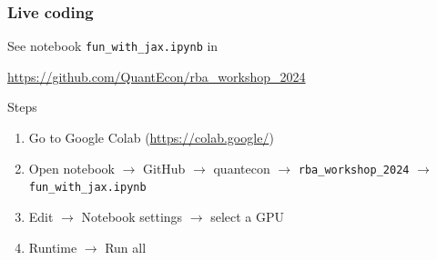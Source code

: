 \documentclass[
    xcolor={svgnames,dvipsnames},
    hyperref={colorlinks, citecolor=DeepPink4, linkcolor=DarkRed, urlcolor=DarkBlue}
    ]{beamer}  %
\newcommand{\1}{\mathbbm 1}
\begin{document}
\begin{frame}
    \frametitle{Live coding}

    See notebook \texttt{fun\_with\_jax.ipynb} in
    
    \begin{center}
        \url{https://github.com/QuantEcon/rba_workshop_2024}
    \end{center}

    \vspace{0.5em}
    Steps
    \begin{enumerate}
    \item Go to Google Colab (\url{https://colab.google/})
    \vspace{0.5em}
    \item Open notebook $\to$ GitHub $\to$ quantecon $\to$ \texttt{rba\_workshop\_2024}
        $\to$ \texttt{fun\_with\_jax.ipynb}
    \vspace{0.5em}
    \item Edit $\to$ Notebook settings $\to$ select a GPU
    \vspace{0.5em}
    \item Runtime $\to$ Run all
    \end{enumerate}

\end{frame}
\end{document}
